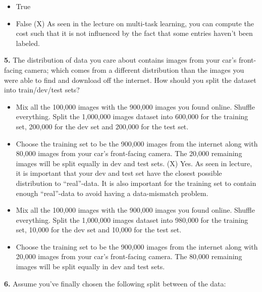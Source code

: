 \begin{itemize}
    \item True
    \item False (X) As seen in the lecture on multi-task learning, you can compute the cost such that it is not influenced by the fact that some entries haven’t been labeled.
\end{itemize}
\textbf{5.} The distribution of data you care about contains images from your car’s front-facing camera; which comes from a different distribution than the images you were able to find and download off the internet. How should you split the dataset into train/dev/test sets?
\begin{itemize}
    \item Mix all the 100,000 images with the 900,000 images you found online. Shuffle everything. Split the 1,000,000 images dataset into 600,000 for the training set, 200,000 for the dev set and 200,000 for the test set.
    \item Choose the training set to be the 900,000 images from the internet along with 80,000 images from your car’s front-facing camera. The 20,000 remaining images will be split equally in dev and test sets. (X) Yes. As seen in lecture, it is important that your dev and test set have the closest possible distribution to “real”-data. It is also important for the training set to contain enough “real”-data to avoid having a data-mismatch problem.
    \item Mix all the 100,000 images with the 900,000 images you found online. Shuffle everything. Split the 1,000,000 images dataset into 980,000 for the training set, 10,000 for the dev set and 10,000 for the test set.
    \item Choose the training set to be the 900,000 images from the internet along with 20,000 images from your car’s front-facing camera. The 80,000 remaining images will be split equally in dev and test sets.
\end{itemize}
\textbf{6.} Assume you’ve finally chosen the following split between of the data:

